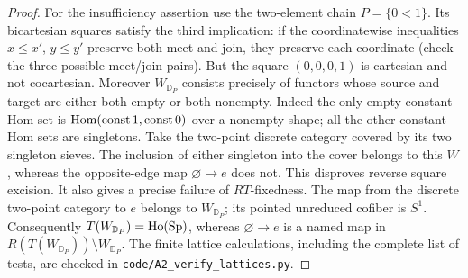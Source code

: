 \begin{proof}
For the insufficiency assertion use the two-element chain $P=\{0<1\}$.
Its bicartesian squares satisfy the third implication: if the coordinatewise
inequalities $x\le x'$, $y\le y'$ preserve both meet and join, they preserve
each coordinate (check the three possible meet/join pairs). But the square
$(0,0,0,1)$ is cartesian and not cocartesian. Moreover $W_{\mathbb D_P}$
consists precisely of functors whose source and target are either both empty
or both nonempty. Indeed the only empty constant-Hom set is
$\operatorname{Hom}(\operatorname{const}1,\operatorname{const}0)$ over a nonempty shape;
all the other constant-Hom sets are singletons. Take the two-point discrete
category covered by its two singleton sieves. The inclusion of either
singleton into the cover belongs to this $W$, whereas the opposite-edge
map $\varnothing\to e$ does not. This disproves reverse square excision.
It also gives a precise failure of $RT$-fixedness. The map from the discrete
two-point category to $e$ belongs to $W_{\mathbb D_P}$; its pointed
unreduced cofiber is $S^1$. Consequently $T(W_{\mathbb D_P})=\mathrm{Ho}(\mathrm{Sp})$,
whereas $\varnothing\to e$ is a named map in
$R(T(W_{\mathbb D_P}))\setminus W_{\mathbb D_P}$.
The finite lattice calculations, including the complete list of tests,
are checked in \texttt{code/A2\_verify\_lattices.py}.
\end{proof}

